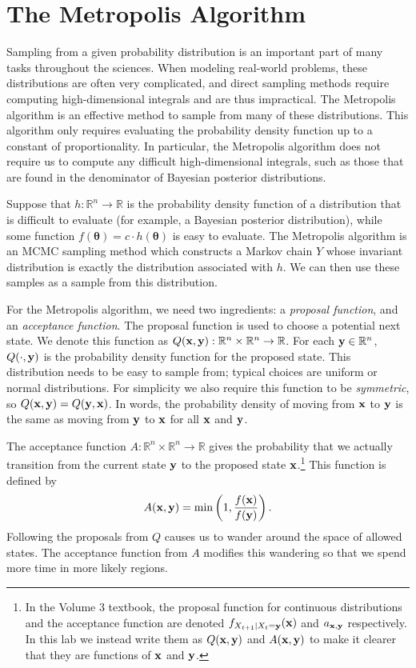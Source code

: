
\section*{The Metropolis Algorithm}
Sampling from a given probability distribution is an important part of many tasks throughout the sciences.
When modeling real-world problems, these distributions are often very complicated, and direct sampling methods require computing high-dimensional integrals and are thus impractical.
The Metropolis algorithm is an effective method to sample from many of these distributions.
This algorithm only requires evaluating the probability density function up to a constant of proportionality. 
In particular, the Metropolis algorithm does not require us to compute any difficult high-dimensional integrals, such as those that are found
in the denominator of Bayesian posterior distributions.

Suppose that $h : \mathbb{R}^n \rightarrow \mathbb{R}$ is the probability density function of a distribution that is difficult to evaluate (for example, a Bayesian posterior distribution), while some function $f(\boldsymbol{\theta}) = c \cdot h(\boldsymbol{\theta})$ is easy to evaluate.
The Metropolis algorithm is an MCMC sampling method which constructs a Markov chain $Y$ whose invariant distribution is exactly the distribution associated with $h$.
We can then use these samples as a sample from this distribution.

For the Metropolis algorithm, we need two ingredients: a \emph{proposal function}, and an \emph{acceptance function}.
The proposal function is used to choose a potential next state.
We denote this function as $Q(\mathbf{x},\mathbf{y}): \mathbb{R}^n \times \mathbb{R}^n \rightarrow \mathbb{R}$.
For each $\mathbf{y}\in \mathbb{R}^n$, $Q(\cdot, \mathbf{y})$ is the probability density function for the proposed state.
This distribution needs to be easy to sample from; typical choices are uniform or normal distributions.
For simplicity we also require this function to be \emph{symmetric}, so $Q(\mathbf{x},\mathbf{y})=Q(\mathbf{y},\mathbf{x})$.
In words, the probability density of moving from $\mathbf{x}$ to $\mathbf{y}$ is the same as moving from $\mathbf{y}$ to $\mathbf{x}$ for all $\mathbf{x}$ and $\mathbf{y}$.

The acceptance function $A : \mathbb{R}^n \times \mathbb{R}^n \rightarrow \mathbb{R}$ gives the probability that we actually transition from the current state $\mathbf{y}$ to the proposed state $\mathbf{x}$.\footnote{In the Volume 3 textbook, the proposal function for continuous distributions and the acceptance function are denoted $f_{X_{t+1}|X_t=\mathbf{y}}(\mathbf{x})$ and $a_{\mathbf{x},\mathbf{y}}$ respectively. In this lab we instead write them as $Q(\mathbf{x},\mathbf{y})$ and $A(\mathbf{x},\mathbf{y})$ to make it clearer that they are functions of $\mathbf{x}$ and $\mathbf{y}$.}
This function is defined by
\[
A(\mathbf{x},\mathbf{y}) = \min\left(1, \frac{f(\mathbf{x})}{f(\mathbf{y})}\right).
\]
Following the proposals from $Q$ causes us to wander around the space of allowed states.
The acceptance function from $A$ modifies this wandering so that we spend more time in more likely regions.

